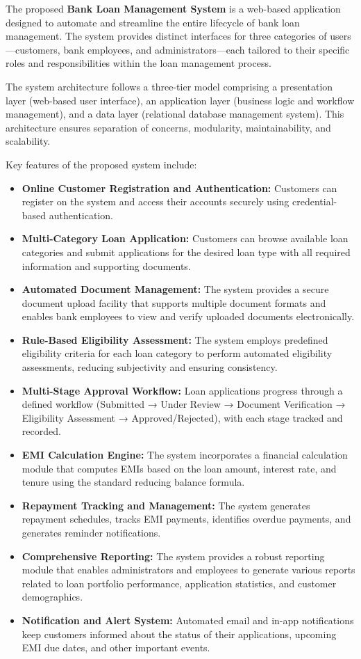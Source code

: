 \documentclass[12pt,a4paper,oneside]{report}
\begin{document}
The proposed \textbf{Bank Loan Management System} is a web-based application designed to automate and streamline the entire lifecycle of bank loan management. The system provides distinct interfaces for three categories of users—customers, bank employees, and administrators—each tailored to their specific roles and responsibilities within the loan management process.

The system architecture follows a three-tier model comprising a presentation layer (web-based user interface), an application layer (business logic and workflow management), and a data layer (relational database management system). This architecture ensures separation of concerns, modularity, maintainability, and scalability.

Key features of the proposed system include:

\begin{itemize}
  \item \textbf{Online Customer Registration and Authentication:} Customers can register on the system and access their accounts securely using credential-based authentication.
  \item \textbf{Multi-Category Loan Application:} Customers can browse available loan categories and submit applications for the desired loan type with all required information and supporting documents.
  \item \textbf{Automated Document Management:} The system provides a secure document upload facility that supports multiple document formats and enables bank employees to view and verify uploaded documents electronically.
  \item \textbf{Rule-Based Eligibility Assessment:} The system employs predefined eligibility criteria for each loan category to perform automated eligibility assessments, reducing subjectivity and ensuring consistency.
  \item \textbf{Multi-Stage Approval Workflow:} Loan applications progress through a defined workflow (Submitted → Under Review → Document Verification → Eligibility Assessment → Approved/Rejected), with each stage tracked and recorded.
  \item \textbf{EMI Calculation Engine:} The system incorporates a financial calculation module that computes EMIs based on the loan amount, interest rate, and tenure using the standard reducing balance formula.
  \item \textbf{Repayment Tracking and Management:} The system generates repayment schedules, tracks EMI payments, identifies overdue payments, and generates reminder notifications.
  \item \textbf{Comprehensive Reporting:} The system provides a robust reporting module that enables administrators and employees to generate various reports related to loan portfolio performance, application statistics, and customer demographics.
  \item \textbf{Notification and Alert System:} Automated email and in-app notifications keep customers informed about the status of their applications, upcoming EMI due dates, and other important events.
\end{itemize}
\end{document}
